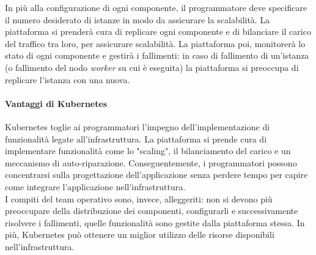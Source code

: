 \documentclass{article}
\begin{document}
In più alla configurazione di ogni componente, il programmatore deve specificare il numero desiderato di istanze in modo da assicurare la scalabilità. La piattaforma si prenderà cura di replicare ogni componente e di bilanciare il carico del traffico tra loro, per assicurare scalabilità. La piattaforma poi, monitorerà lo stato di ogni componente e gestirà i fallimenti: in caso di fallimento di un'istanza (o fallimento del nodo \textit{worker} su cui è eseguita) la piattaforma si preoccupa di replicare l'istanza con una nuova.

\paragraph{Vantaggi di Kubernetes}
Kubernetes toglie ai programmatori l'impegno dell'implementazione di funzionalità legate all'infrastruttura. La piattaforma si prende cura di implementare funzionalità come lo "scaling", il bilanciamento del carico e un meccanismo di auto-riparazione. Conseguentemente, i programmatori possono concentrarsi sulla progettazione dell'applicazione senza perdere tempo per capire come integrare l'applicazione nell'infrastruttura. \\
I compiti del team operativo sono, invece, alleggeriti: non si devono più preoccupare della distribuzione dei componenti, configurarli e successivamente risolvere i fallimenti, quelle funzionalità sono gestite dalla piattaforma stessa. In più, Kubernetes può ottenere un miglior utilizzo delle risorse disponibili nell'infrastruttura. 
\end{document}
